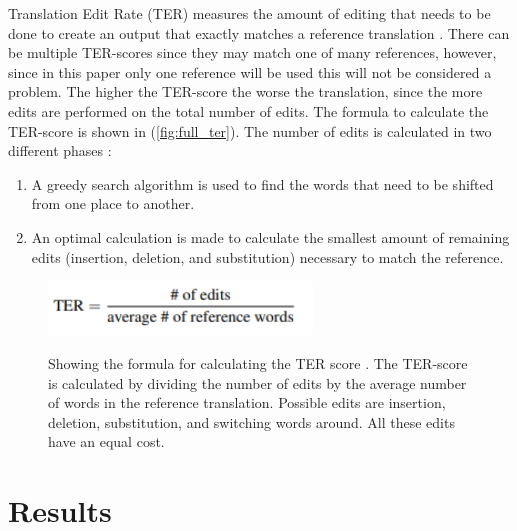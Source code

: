 Translation Edit Rate (TER) measures the amount of editing that needs to be done to create an output that exactly matches a reference translation \cite{TERsnover2006}. There can be multiple TER-scores since they may match one of many references, however, since in this paper only one reference will be used this will not be considered a problem. The higher the TER-score the worse the translation, since the more edits are performed on the total number of edits. The formula to calculate the TER-score is shown in (\autoref{fig:full_ter}). The number of edits is calculated in two different phases \cite{shapira2002edit}:
\begin{enumerate}
    \item A greedy search algorithm is used to find the words that need to be shifted from one place to another.
    \item An optimal calculation is made to calculate the smallest amount of remaining edits (insertion, deletion, and substitution) necessary to match the reference.
\end{enumerate}



\begin{figure}[h]
 \caption{Showing the formula for calculating the TER score \cite{TERsnover2006}. The TER-score is calculated by dividing the number of edits by the average number of words in the reference translation. Possible edits are insertion, deletion, substitution, and switching words around. All these edits have an equal cost.}
 \centering 
 \includegraphics[width=7cm]{Bachelor CSAI thesis template/images/ter_formula.PNG}
 \label{fig:full_ter}
\end{figure}


\break

\section{Results}

